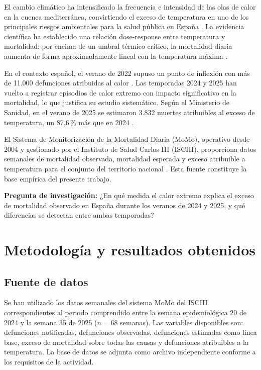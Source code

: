 \documentclass[11pt, a4paper]{article}
\begin{document}
El cambio climático ha intensificado la frecuencia e intensidad de las olas de
calor en la cuenca mediterránea, convirtiendo el exceso de temperatura en uno
de los principales riesgos ambientales para la salud pública en España
\cite{romanello2023}. La evidencia científica ha establecido una relación
dose-response entre temperatura y mortalidad: por encima de un umbral térmico
crítico, la mortalidad diaria aumenta de forma aproximadamente lineal con la
temperatura máxima \cite{gasparrini2017}.

En el contexto español, el verano de 2022 supuso un punto de inflexión con más
de 11.000 defunciones atribuidas al calor \cite{momo2022}. Las temporadas
2024 y 2025 han vuelto a registrar episodios de calor extremo con impacto
significativo en la mortalidad, lo que justifica su estudio sistemático. Según
el Ministerio de Sanidad, en el verano de 2025 se estimaron 3.832 muertes
atribuibles al exceso de temperatura, un 87{,}6\,\% más que en 2024
\cite{sanidad2025}.

El Sistema de Monitorización de la Mortalidad Diaria (MoMo), operativo desde
2004 y gestionado por el Instituto de Salud Carlos III (ISCIII), proporciona
datos semanales de mortalidad observada, mortalidad esperada y exceso
atribuible a temperatura para el conjunto del territorio nacional
\cite{momo2024}. Esta fuente constituye la base empírica del presente trabajo.

\textbf{Pregunta de investigación:} ¿En qué medida el calor extremo explica el
exceso de mortalidad observado en España durante los veranos de 2024 y 2025,
y qué diferencias se detectan entre ambas temporadas?

\section{Metodología y resultados obtenidos}

\subsection{Fuente de datos}

Se han utilizado los datos semanales del sistema MoMo del ISCIII correspondientes
al periodo comprendido entre la semana epidemiológica 20 de 2024 y la semana
35 de 2025 ($n = 68$ semanas). Las variables disponibles son: defunciones
notificadas, defunciones observadas, defunciones estimadas como línea base,
exceso de mortalidad sobre todas las causas y defunciones atribuibles a la
temperatura. La base de datos se adjunta como archivo independiente conforme
a los requisitos de la actividad.
\end{document}
